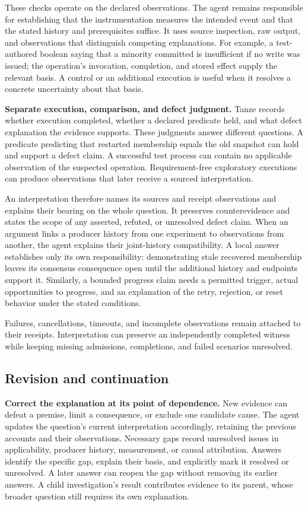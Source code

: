 \documentclass[10pt,twocolumn,letterpaper]{article}
\newcommand{\sys}{Tanze}
\begin{document}
These checks operate on the declared observations. The agent remains responsible for establishing that the instrumentation measures the intended event and that the stated history and prerequisites suffice. It uses source inspection, raw output, and observations that distinguish competing explanations. For example, a test-authored boolean saying that a minority committed is insufficient if no write was issued; the operation's invocation, completion, and stored effect supply the relevant basis. A control or an additional execution is useful when it resolves a concrete uncertainty about that basis.

\textbf{Separate execution, comparison, and defect judgment.}
\sys{} records whether execution completed, whether a declared predicate held, and what defect explanation the evidence supports. These judgments answer different questions. A predicate predicting that restarted membership equals the old snapshot can hold and support a defect claim. A successful test process can contain no applicable observation of the suspected operation. Requirement-free exploratory executions can produce observations that later receive a sourced interpretation.

An interpretation therefore names its sources and receipt observations and explains their bearing on the whole question. It preserves counterevidence and states the scope of any asserted, refuted, or unresolved defect claim. When an argument links a producer history from one experiment to observations from another, the agent explains their joint-history compatibility. A local answer establishes only its own responsibility: demonstrating stale recovered membership leaves its consensus consequence open until the additional history and endpoints support it. Similarly, a bounded progress claim needs a permitted trigger, actual opportunities to progress, and an explanation of the retry, rejection, or reset behavior under the stated conditions.

Failures, cancellations, timeouts, and incomplete observations remain attached to their receipts. Interpretation can preserve an independently completed witness while keeping missing admissions, completions, and failed scenarios unresolved.

\subsection{Revision and continuation}
\label{sec:continuation}

\textbf{Correct the explanation at its point of dependence.}
New evidence can defeat a premise, limit a consequence, or exclude one candidate cause. The agent updates the question's current interpretation accordingly, retaining the previous accounts and their observations. Necessary gaps record unresolved issues in applicability, producer history, measurement, or causal attribution. Answers identify the specific gap, explain their basis, and explicitly mark it resolved or unresolved. A later answer can reopen the gap without removing its earlier answers. A child investigation's result contributes evidence to its parent, whose broader question still requires its own explanation.
\end{document}

